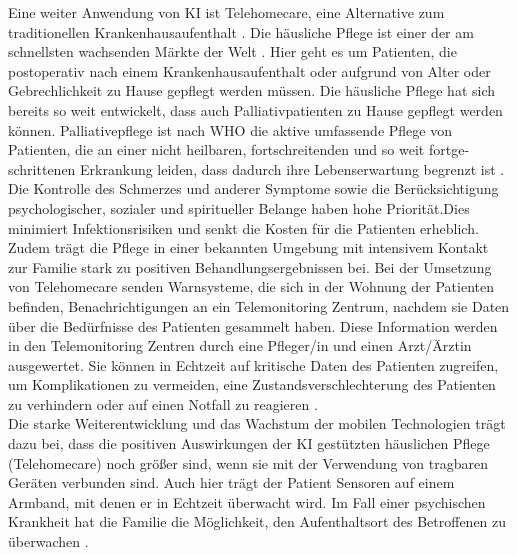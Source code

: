 Eine weiter Anwendung von KI ist Telehomecare, eine Alternative zum traditionellen Krankenhausaufenthalt \cite{Chapter_14}. Die häusliche Pflege ist einer der am schnellsten wachsenden Märkte der Welt \cite{Chapter_14}. Hier geht es um Patienten, die postoperativ nach einem Krankenhausaufenthalt oder aufgrund von Alter oder Gebrechlichkeit zu Hause gepflegt werden müssen. Die häusliche Pflege hat sich bereits so weit entwickelt, dass auch Palliativpatienten zu Hause gepflegt werden können. Palliativepflege ist nach WHO die aktive um­fassen­de Pflege von Patienten, die an ei­ner nicht heil­baren, fort­schreiten­den und so weit fort­ge­schritte­nen Erkrankung leiden, dass dadurch ih­re Le­bens­er­wartung be­grenzt ist \cite{Pshyrembel}. Die Kontrolle des Schmerzes und an­derer Symptome so­wie die Berück­sichtigung psy­cho­lo­gischer, sozialer und spiri­tu­el­ler Belange haben hohe Prio­rität.Dies minimiert Infektionsrisiken und senkt die Kosten für die Patienten erheblich. Zudem trägt die Pflege in einer bekannten Umgebung mit intensivem Kontakt zur Familie stark zu positiven Behandlungsergebnissen bei.
Bei der Umsetzung von Telehomecare senden Warnsysteme, die sich in der Wohnung der Patienten befinden, Benachrichtigungen an ein Telemonitoring Zentrum, nachdem sie Daten über die Bedürfnisse des Patienten gesammelt haben.\cite{Chapter_14} Diese Information werden in den Telemonitoring Zentren durch eine Pfleger/in und einen Arzt/Ärztin ausgewertet. Sie können in Echtzeit auf kritische Daten des Patienten zugreifen, um Komplikationen zu vermeiden, eine Zustandsverschlechterung des Patienten zu verhindern oder auf einen Notfall zu reagieren \cite{Chapter_14}.\\
Die starke Weiterentwicklung und das Wachstum der mobilen Technologien trägt dazu bei, dass die positiven Auswirkungen der KI gestützten häuslichen Pflege (Telehomecare) noch größer sind, wenn sie mit der Verwendung von tragbaren Geräten verbunden sind. Auch hier trägt der Patient Sensoren auf einem Armband, mit denen er in Echtzeit überwacht wird. Im Fall einer psychischen Krankheit hat die Familie die Möglichkeit, den Aufenthaltsort des Betroffenen zu überwachen \cite{Chapter_14}.